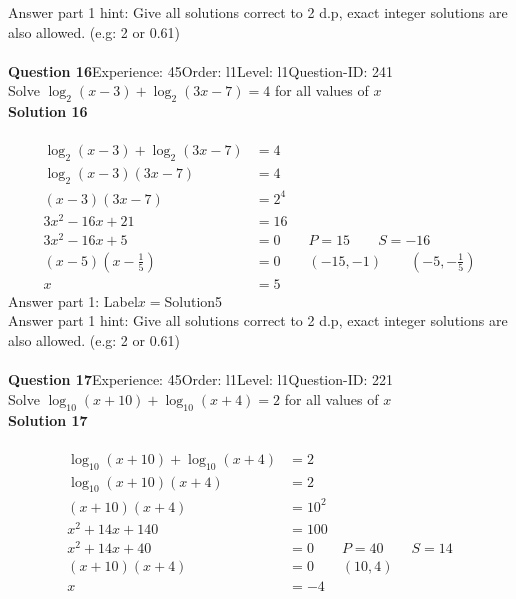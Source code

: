 \documentclass{article}
\begin{document}
Answer part 1 hint: \hspace{15pt}Give all solutions correct to 2 d.p, exact integer solutions are also allowed. (e.g: 2 or 0.61)\\
\\[4pt]
\noindent\textbf{Question 16}\hspace{20pt}Experience: 45\hspace{20pt}Order: l1\hspace{20pt}Level: l1\hspace{20pt}Question-ID: 241\\[2pt]
Solve $\log_{2}(x-3)+\log_{2}(3x-7)=4$ for all values of $x$\\[4pt]
\noindent\textbf{Solution 16}\\[2pt]
\\[-35pt]\begin{align*}
\log_{2}(x-3)+\log_{2}(3x-7)&=4\\[2pt]
\log_{2}(x-3)(3x-7)&=4\\[2pt]
(x-3)(3x-7)&=2^4\\[2pt]
3x^2-16x+21&=16\\[2pt]
3x^2-16x+5&=0\qquad P=15 \qquad S=-16\\[2pt]
(x-5)\left(x-\displaystyle\frac{1}{5}\right)&=0\qquad (-15,-1) \qquad \left(-5,-\displaystyle\frac{1}{5}\right)\\[2pt]
x&=5
\end{align*}
Answer part 1: \hspace{10pt}Label\hspace{10pt}$x=$\hspace{10pt}Solution\hspace{10pt}5\\
Answer part 1 hint: \hspace{15pt}Give all solutions correct to 2 d.p, exact integer solutions are also allowed. (e.g: 2 or 0.61)\\
\\[4pt]
\noindent\textbf{Question 17}\hspace{20pt}Experience: 45\hspace{20pt}Order: l1\hspace{20pt}Level: l1\hspace{20pt}Question-ID: 221\\[2pt]
Solve $\log_{10}(x+10)+\log_{10}(x+4)=2$ for all values of $x$\\[4pt]
\noindent\textbf{Solution 17}\\[2pt]
\\[-35pt]\begin{align*}
\log_{10}(x+10)+\log_{10}(x+4)&=2\\[2pt]
\log_{10}(x+10)(x+4)&=2\\[2pt]
(x+10)(x+4)&=10^2\\[2pt]
x^2+14x+140&=100\\[2pt]
x^2+14x+40&=0\qquad P=40 \qquad S=14\\[2pt]
(x+10)(x+4)&=0\qquad (10,4)\\[2pt]
x&=-4
\end{align*}
\end{document}
